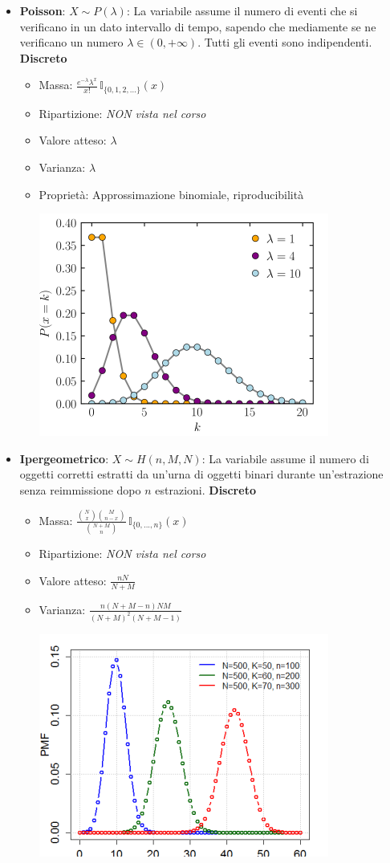 \documentclass{article}
\begin{document}
\begin{itemize}
    \item \textbf{Poisson}: $X \sim P(\lambda)$: La variabile assume il numero di eventi che si veriﬁcano in un dato intervallo di tempo, sapendo che mediamente se ne veriﬁcano un numero $\lambda \in (0, +\infty)$. Tutti gli eventi sono indipendenti. \textbf{Discreto}
    \begin{itemize}
        \item Massa: $\frac{e^{-\lambda} \lambda^x}{x!} \, \mathbb{I}_{\{0, 1, 2, \dots\}}(x)$
        \item Ripartizione: \textit{NON vista nel corso}
        \item Valore atteso: $\lambda$
        \item Varianza: $\lambda$
        \item Proprietà: Approssimazione binomiale, riproducibilità
        \begin{center}
            \includegraphics[width=0.4\linewidth]{./immagini/poisson.png}
        \end{center}
    \end{itemize}

    \item \textbf{Ipergeometrico}: $X \sim H(n, M, N)$: La variabile assume il numero di oggetti corretti estratti da un’urna di oggetti binari durante un’estrazione senza reimmissione dopo $n$ estrazioni. \textbf{Discreto}
    \begin{itemize}
        \item Massa: $\frac{\binom{N}{x} \binom{M}{n-x}}{\binom{N+M}{n}} \, \mathbb{I}_{\{0, ..., n\}}(x)$
        \item Ripartizione: \textit{NON vista nel corso}
        \item Valore atteso: $\frac{n N}{N + M}$
        \item Varianza: $\frac{n (N + M - n) N M}{(N+M)^2 (N + M - 1)}$
        \begin{center}
            \includegraphics[width=0.4\linewidth]{./immagini/ipergeometrico.png}
        \end{center}
    \end{itemize}


\end{itemize}
\end{document}
